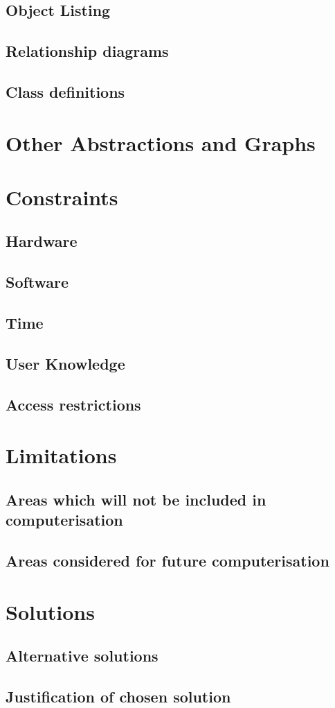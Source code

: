 \subsection{Object Listing}

\subsection{Relationship diagrams}

\subsection{Class definitions}

\section{Other Abstractions and Graphs}

\section{Constraints}

\subsection{Hardware}

\subsection{Software}

\subsection{Time}

\subsection{User Knowledge}

\subsection{Access restrictions}

\section{Limitations}

\subsection{Areas which will not be included in computerisation}

\subsection{Areas considered for future computerisation}

\section{Solutions}

\subsection{Alternative solutions}

\subsection{Justification of chosen solution}

